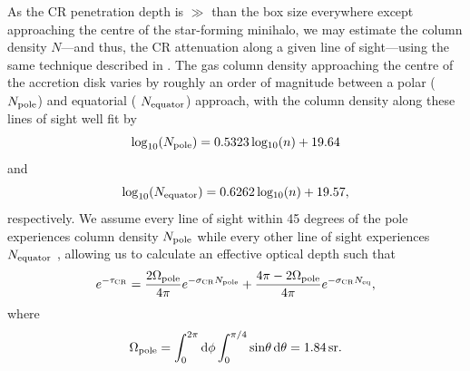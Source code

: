 \documentclass[usenatbib]{mn2e}
\begin{document}
As the CR penetration depth is $\gg$ than the box size everywhere except approaching the centre of the star-forming minihalo, we may estimate the column density $N$---and thus, the CR attenuation along a given line of sight---using the same technique described in \citet{Hummeletal2015}. 
The gas column density approaching the centre of the accretion disk varies by roughly an order of magnitude between a polar ($N_{\rm \small pole}$) and equatorial ( $N_{\rm \small equator}$) approach, with the column density  along these lines of sight well fit by
\begin{equation}
{\rm log}_{10}(N_{\rm \small pole}) = 0.5323\, {\rm log_{10}}(n) + 19.64
\end{equation}
and
\begin{equation}
{\rm log}_{10}(N_{\rm \small equator}) = 0.6262\, {\rm log_{10}}(n) + 19.57, 
\end{equation}
respectively. We assume every line of sight within 45 degrees of the pole experiences column density $N_{\rm \small pole}$ while every other line of sight experiences $N_{\rm \small equator}$ \citep{Hosokawaetal2011}, allowing us to calculate an effective optical depth such that
\begin{equation}
e^{-\tau_{\rm \small CR}} = \frac{2 \Omega_{\rm \small pole}}{4\pi} e^{-\sigma_{\rm \small CR} N_{\rm \small pole}} + \frac{4\pi - 2 \Omega_{\rm \small pole}}{4\pi} e^{-\sigma_{\rm \small CR} N_{\rm \small eq}},
\end{equation}
where
\begin{equation}
\Omega_{\rm \small pole} = \int_0^{2\pi}{\rm d}\phi \int_0^{\pi/4}{\rm sin}\theta \,{\rm d}\theta = 1.84\,{\rm sr}.
\end{equation}
\end{document}
